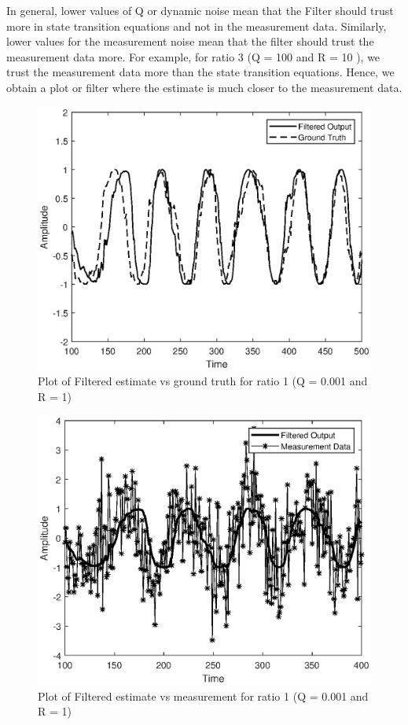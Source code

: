 \documentclass{article}
\begin{document}
In general, lower values of Q or dynamic noise mean that the Filter should trust more in state transition equations and not in the measurement data. Similarly, lower values for the measurement noise mean that the filter should trust the measurement data more. For example, for ratio 3 (Q = 100 and R = 10 ), we trust the measurement data more than the state transition equations. Hence, we obtain a plot or filter where the estimate is much closer to the measurement data.\\
\vspace{2cm}
\begin{figure}[!ht]
\centering
\includegraphics[scale=0.60]{ratio1_filt_vs_ground.eps}
\caption{Plot of Filtered estimate vs ground truth for ratio 1 (Q = 0.001 and R = 1)}
\label{fig:first}
\end{figure}

\begin{figure}
\centering
\includegraphics[scale=0.50]{ratio1_filt_vs_measure.eps}
\caption{Plot of Filtered estimate vs measurement for ratio 1 (Q = 0.001 and R = 1)}
\label{fig:second}
\end{figure}
\end{document}

